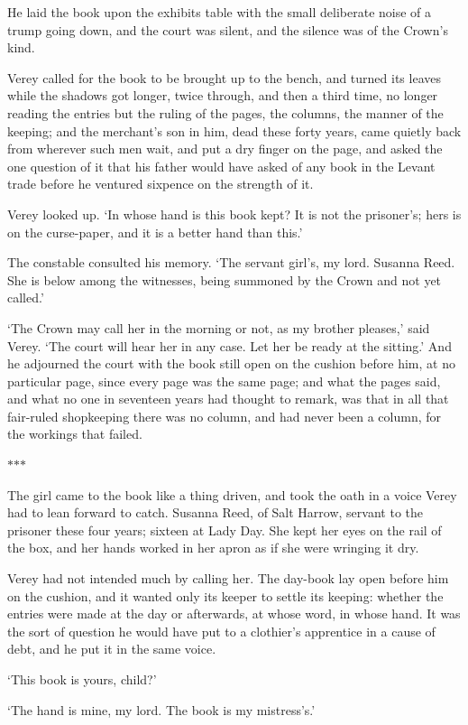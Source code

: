 \documentclass[11pt]{article}
\newcommand{\scenebreak}{%
  \par\vspace{1.1\baselineskip}%
  {\centering $\ast$\quad$\ast$\quad$\ast$\par}%
  \vspace{1.1\baselineskip}\noindent}
\begin{document}
He laid the book upon the exhibits table with the small deliberate noise of a trump going down, and the court was silent, and the silence was of the Crown's kind.

Verey called for the book to be brought up to the bench, and turned its leaves while the shadows got longer, twice through, and then a third time, no longer reading the entries but the ruling of the pages, the columns, the manner of the keeping; and the merchant's son in him, dead these forty years, came quietly back from wherever such men wait, and put a dry finger on the page, and asked the one question of it that his father would have asked of any book in the Levant trade before he ventured sixpence on the strength of it.

Verey looked up. `In whose hand is this book kept? It is not the prisoner's; hers is on the curse-paper, and it is a better hand than this.'

The constable consulted his memory. `The servant girl's, my lord. Susanna Reed. She is below among the witnesses, being summoned by the Crown and not yet called.'

`The Crown may call her in the morning or not, as my brother pleases,' said Verey. `The court will hear her in any case. Let her be ready at the sitting.' And he adjourned the court with the book still open on the cushion before him, at no particular page, since every page was the same page; and what the pages said, and what no one in seventeen years had thought to remark, was that in all that fair-ruled shopkeeping there was no column, and had never been a column, for the workings that failed.

\scenebreak
\noindent The girl came to the book like a thing driven, and took the oath in a voice Verey had to lean forward to catch. Susanna Reed, of Salt Harrow, servant to the prisoner these four years; sixteen at Lady Day. She kept her eyes on the rail of the box, and her hands worked in her apron as if she were wringing it dry.

Verey had not intended much by calling her. The day-book lay open before him on the cushion, and it wanted only its keeper to settle its keeping: whether the entries were made at the day or afterwards, at whose word, in whose hand. It was the sort of question he would have put to a clothier's apprentice in a cause of debt, and he put it in the same voice.

`This book is yours, child?'

`The hand is mine, my lord. The book is my mistress's.'
\end{document}
